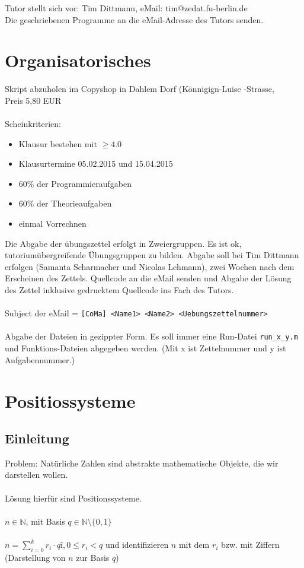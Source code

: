 \documentclass{llncs}
\begin{document}
Tutor stellt sich vor: Tim Dittmann, eMail: tim@zedat.fu-berlin.de\\
Die geschriebenen Programme an die eMail-Adresse des Tutors senden.

\section*{Organisatorisches}

Skript abzuholen im Copyshop in Dahlem Dorf (K\"onnigign-Luise -Strasse,\\
Preis 5,80 EUR\\
\\
Scheinkriterien:
\begin{itemize}
\item Klausur bestehen mit $\geq 4.0$
\item Klausurtermine 05.02.2015 und 15.04.2015
\item 60\% der Programmieraufgaben
\item 60\% der Theorieaufgaben
\item einmal Vorrechnen
\end{itemize}
Die Abgabe der \"ubungszettel erfolgt in Zweiergruppen. Es ist ok, tutorium\"ubergreifende \"Ubungsgruppen zu bilden.
Abgabe soll bei Tim Dittmann erfolgen (Samanta Scharmacher und Nicolas Lehmann), zwei Wochen nach dem Erscheinen des Zettels. Quellcode an die eMail senden und Abgabe der L\"osung des Zettel inklusive gedrucktem Quellcode ins Fach des Tutors.\\
\\
Subject der eMail = \texttt{[CoMa] <Name1> <Name2> <Uebungszettelnummer>}\\
\\
Abgabe der Dateien in gezippter Form. Es soll immer eine Run-Datei \texttt{run\_x\_y.m} und Funktions-Dateien abgegeben werden. (Mit x ist Zettelnummer und y ist Aufgabennummer.)

\section*{Positiossysteme}

\subsection*{Einleitung}

Problem: Nat\"urliche Zahlen sind abstrakte mathematische Objekte, die wir darstellen wollen.\\
\\
L\"osung hierf\"ur sind Positionssysteme.\\
\\
$n  \in \mathbb{N}$, mit Basis $q \in \mathbb{N} \setminus \{0,1\}$\\
\\
$n = \sum_{i=0}^{k} r_i \cdot qî, 0 \leq r_i < q$ und identifizieren $n$ mit dem $r_i$ bzw. mit Ziffern (Darstellung von $n$ zur Basis $q$)
\end{document}
